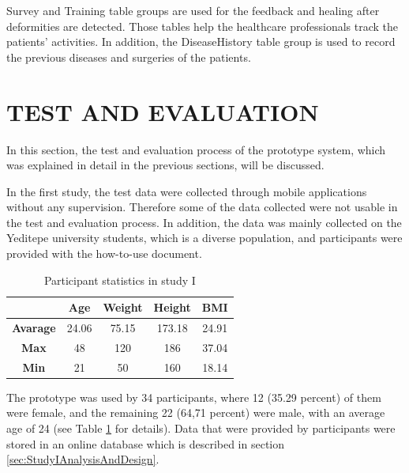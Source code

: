 Survey and Training table groups are used for the feedback and healing after deformities are detected. Those tables help the healthcare professionals track the patients' activities. In addition, the DiseaseHistory table group is used to record the previous diseases and surgeries of the patients.

\section{TEST AND EVALUATION} \label{sec:StudyITestAndEvaluation}

In this section, the test and evaluation process of the prototype system, which was explained in detail in the previous sections, will be discussed.

In the first study, the test data were collected through mobile applications without any supervision. Therefore some of the data collected were not usable in the test and evaluation process. In addition, the data was mainly collected on the Yeditepe university students, which is a diverse population, and participants were provided with the how-to-use document.

\begin{table}[htbp]
\begin{center}
\caption{Participant statistics in study I}
      \begin{tabular}{|c|c|c|c|c|} \hline
          & \textbf{Age} & \textbf{Weight} & \textbf{Height} & \textbf{BMI} \\ \hline
        \textbf{Avarage} & 24.06 & 75.15 & 173.18 & 24.91 \\ \hline
        \textbf{Max} & 48 & 120 & 186 & 37.04 \\ \hline
        \textbf{Min} & 21 & 50 & 160 & 18.14 \\ \hline
    \end{tabular}
\label{tab:StudyIParticipantStatistics}
\end{center}
\end{table}

The prototype was used by 34 participants, where 12 (35.29 percent) of them were female, and the remaining 22 (64,71 percent) were male, with an average age of 24 (see Table \ref{tab:StudyIParticipantStatistics} for details). Data that were provided by participants were stored in an online database which is described in section \ref{sec:StudyIAnalysisAndDesign}. 


